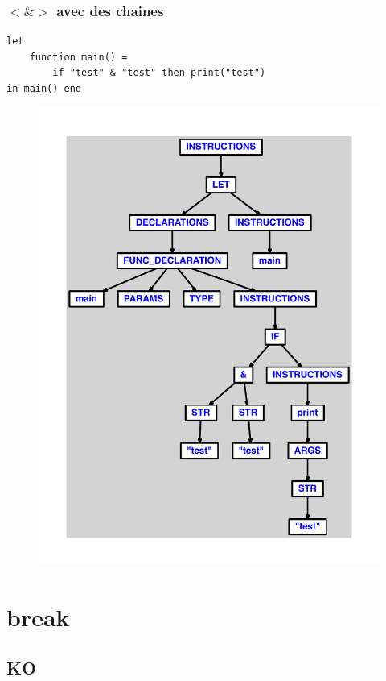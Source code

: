 \documentclass{article}
\begin{document}
\subsubsection{$ < $$ \& $$ > $ avec des chaines}
\begin{lstlisting}
let
	function main() =
		if "test" & "test" then print("test")
in main() end
\end{lstlisting}
\newpage
\begin{figure}[H]
\centering
\includegraphics[max width=\textwidth]{ast/ast_6.pdf}
\end{figure}
\newpage
\section{break}
\subsection{KO}
\end{document}

